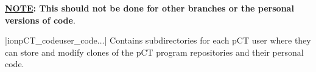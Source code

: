 \begin{tcbenvironment}
\begin{tcbparbox}
\textbf{\ul{NOTE}: This should not be done for other branches or the personal versions of code}.
\end{tcbparbox}
\begin{tcbparbox}|\dirsep ion\dirsep pCT\_code\dirsep user\_code\dirsep{}\dirsep$\dots$|
\bfdash Contains subdirectories for each pCT user where they can store and modify clones of the pCT program repositories and their personal code.
\end{tcbparbox}
\end{tcbenvironment}
\endinput 